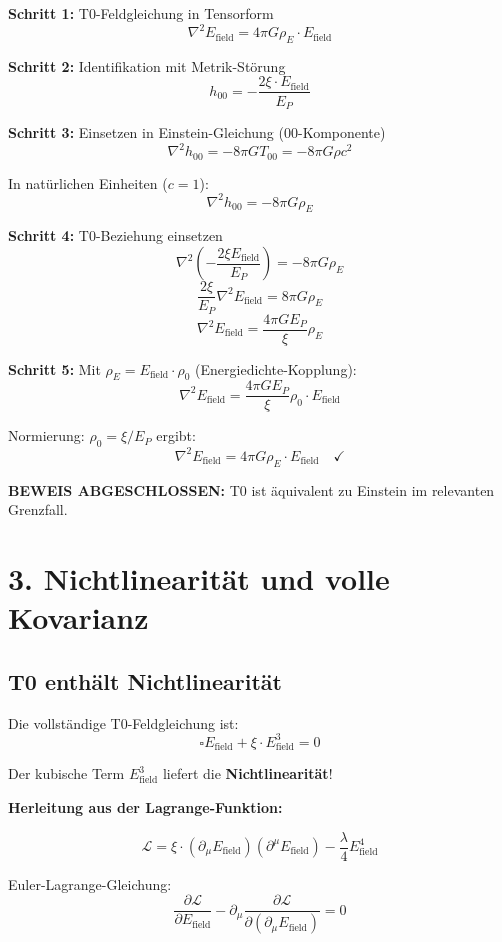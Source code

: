 	\textbf{Schritt 1:} T0-Feldgleichung in Tensorform
	\[
	\nabla^2 E_{\text{field}} = 4\pi G \rho_E \cdot E_{\text{field}}
	\]
	
	\textbf{Schritt 2:} Identifikation mit Metrik-Störung
	\[
	h_{00} = -\frac{2\xi \cdot E_{\text{field}}}{E_P}
	\]
	
	\textbf{Schritt 3:} Einsetzen in Einstein-Gleichung (00-Komponente)
	\[
	\nabla^2 h_{00} = -8\pi G T_{00} = -8\pi G \rho c^2
	\]
	
	In natürlichen Einheiten ($c=1$):
	\[
	\nabla^2 h_{00} = -8\pi G \rho_E
	\]
	
	\textbf{Schritt 4:} T0-Beziehung einsetzen
	\[
	\nabla^2 \left(-\frac{2\xi E_{\text{field}}}{E_P}\right) = -8\pi G \rho_E
	\]
	\[
	\frac{2\xi}{E_P} \nabla^2 E_{\text{field}} = 8\pi G \rho_E
	\]
	\[
	\nabla^2 E_{\text{field}} = \frac{4\pi G E_P}{\xi} \rho_E
	\]
	
	\textbf{Schritt 5:} Mit $\rho_E = E_{\text{field}} \cdot \rho_0$ (Energiedichte-Kopplung):
	\[
	\nabla^2 E_{\text{field}} = \frac{4\pi G E_P}{\xi} \rho_0 \cdot E_{\text{field}}
	\]
	
	Normierung: $\rho_0 = \xi/E_P$ ergibt:
	\[
	\boxed{\nabla^2 E_{\text{field}} = 4\pi G \rho_E \cdot E_{\text{field}}} \quad \checkmark
	\]
	
	\textbf{BEWEIS ABGESCHLOSSEN:} T0 ist äquivalent zu Einstein im relevanten Grenzfall.
	
	\section*{3. Nichtlinearität und volle Kovarianz}
	
	\subsection*{\textbf{T0 enthält Nichtlinearität}}
	
	Die vollständige T0-Feldgleichung ist:
	\[
	\boxed{\square E_{\text{field}} + \xi \cdot E_{\text{field}}^3 = 0}
	\]
	
	Der kubische Term $E_{\text{field}}^3$ liefert die \textbf{Nichtlinearität}!
	
	\textbf{Herleitung aus der Lagrange-Funktion:}
	
	\[
	\mathcal{L} = \xi \cdot (\partial_\mu E_{\text{field}})(\partial^\mu E_{\text{field}}) - \frac{\lambda}{4} E_{\text{field}}^4
	\]
	
	Euler-Lagrange-Gleichung:
	\[
	\frac{\partial \mathcal{L}}{\partial E_{\text{field}}} - \partial_\mu \frac{\partial \mathcal{L}}{\partial(\partial_\mu E_{\text{field}})} = 0
	\]
	
